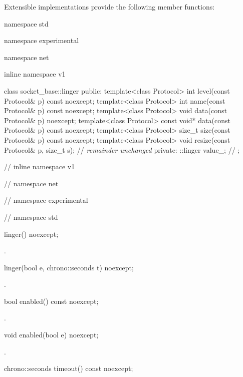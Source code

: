 \pnum
 Extensible implementations provide the following member functions:

\begin{itemdecl}
namespace std {
namespace experimental {
namespace net {
inline namespace v1 {

  class socket_base::linger
  {
  public:
    template<class Protocol> int level(const Protocol& p) const noexcept;
    template<class Protocol> int name(const Protocol& p) const noexcept;
    template<class Protocol> void data(const Protocol& p) noexcept;
    template<class Protocol> const void* data(const Protocol& p) const noexcept;
    template<class Protocol> size_t size(const Protocol& p) const noexcept;
    template<class Protocol> void resize(const Protocol& p, size_t s);
    // \textit{remainder unchanged}
  private:
    ::linger value_;  // \expos
  };

} // inline namespace v1
} // namespace net
} // namespace experimental
} // namespace std

linger() noexcept;
\end{itemdecl}

\begin{itemdescr}
\pnum
\postconditions {}.
\end{itemdescr}

\begin{itemdecl}
linger(bool e, chrono::seconds t) noexcept;
\end{itemdecl}

\begin{itemdescr}
\pnum
\postconditions {}.
\end{itemdescr}

\begin{itemdecl}
bool enabled() const noexcept;
\end{itemdecl}

\begin{itemdescr}
\pnum
\returns {}.
\end{itemdescr}

\begin{itemdecl}
void enabled(bool e) noexcept;
\end{itemdecl}

\begin{itemdescr}
\pnum
\postconditions {}.
\end{itemdescr}

\begin{itemdecl}
chrono::seconds timeout() const noexcept;
\end{itemdecl}

